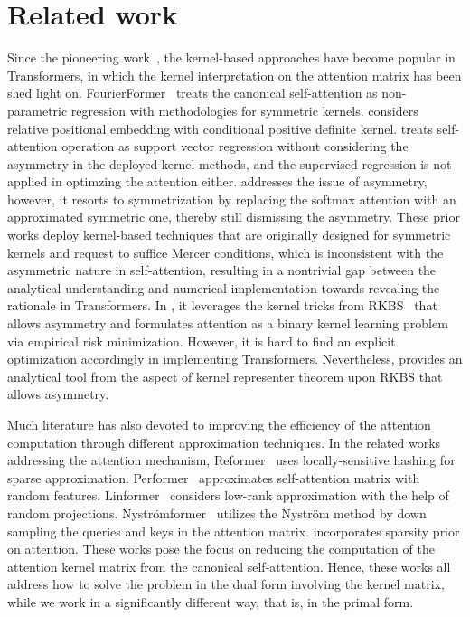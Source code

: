 \documentclass{article}
\begin{document}
\section{Related work}
\label{sec::related_work}

{Since the pioneering work~\cite{tsai2019}, the kernel-based approaches have become popular in Transformers, in which the kernel interpretation on the attention matrix has been shed light on.}
FourierFormer~\cite{nguyen2022fourierformer} treats the canonical self-attention as non-parametric regression with {methodologies for} symmetric kernels.
\cite{chi2022kerple} considers relative positional embedding with conditional positive definite kernel.
\cite{nguyen2023a} treats self-attention operation as support vector regression {without considering the asymmetry in the deployed kernel methods, and the  supervised regression is not applied in optimzing the attention either}.
\cite{chen2021skyformer} addresses the issue of asymmetry, however, it {resorts to symmetrization by replacing the softmax attention with an approximated symmetric one}, {thereby still dismissing the asymmetry}. 
{These prior works deploy} kernel-based techniques {that are originally designed for symmetric kernels and request to suffice Mercer conditions}, which is inconsistent with the asymmetric {nature} in self-attention, {resulting in a nontrivial gap between the analytical understanding and numerical implementation towards revealing the rationale in Transformers}. 
{In \cite{wright2021transformers}, it leverages the kernel tricks from RKBS~\cite{zhang2009reproducing} that allows asymmetry and formulates attention} as a binary kernel learning problem via empirical risk minimization.
However, it is hard to find an explicit optimization accordingly in {implementing Transformers.} 
Nevertheless, \cite{wright2021transformers} {provides an analytical tool from the aspect of kernel representer theorem upon RKBS that allows asymmetry.}


Much literature has also devoted to improving the efficiency of the attention computation through different approximation techniques. 
In the related works addressing the attention mechanism,
Reformer~\cite{kitaev2020reformer} uses locally-sensitive hashing for sparse approximation. 
Performer~\cite{choromanski2021rethinking} approximates self-attention matrix with random features. Linformer~\cite{wang2020linformer} considers low-rank approximation with the help of random projections. 
Nystr\"{o}mformer~\cite{xiong2021nystromformer} utilizes the Nystr\"{o}m method by down sampling the queries and keys in the attention matrix. \cite{child2019generating} incorporates sparsity prior on attention. 
These works pose the focus on  reducing the computation of the attention kernel matrix from the canonical self-attention. 
Hence, these works all address how to solve the problem in the dual form involving the kernel matrix, while we work in a significantly different way, that is, in the primal form.
\end{document}
